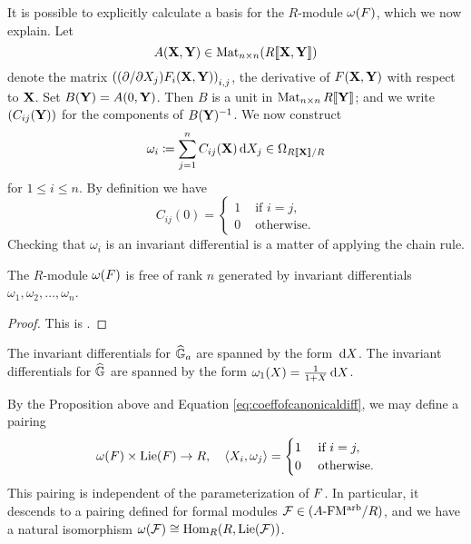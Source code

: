 \documentclass[../main.tex]{subfiles}
\begin{document}
It is possible to explicitly calculate a basis for the $R$-module
$\omega({F})$, which we now explain. Let 
$$A(\mathbf{X}, \mathbf{Y}) \in \operatorname{Mat}_{n \times n} (R\llbracket \mathbf{X}, \mathbf{Y} \rrbracket)$$ 
denote the matrix $\left((\partial/\partial X_j)F_i (\mathbf{X},\mathbf{Y})\right)_{i,j}$,
the derivative of ${F}(\mathbf{X},\mathbf{Y})$ with respect to $\mathbf{X}$. Set 
$B(\mathbf{Y}) = A(0,\mathbf{Y})$. Then $B$ is a unit in $\operatorname{Mat}_{n \times n} R\llbracket \mathbf{Y} \rrbracket$; 
and we write $(C_{ij}(\mathbf{Y}))$ for the components of 
$B(\mathbf{Y})^{-1}$. We now construct 
$$\omega_{i} \coloneqq \sum_{j=1}^n C_{ij}(\mathbf{X}) \, \mathrm{d} X_j \in \Omega_{R\llbracket \mathbf{X} \rrbracket/R}$$ 
for $1 \leq i \leq n$. By definition we have 
\begin{equation}\label{eq:coeffofcanonicaldiff}
  C_{ij}(0) = \begin{cases}
    1 &\text{ if }i = j,\\
    0 &\text{ otherwise.}
  \end{cases}
\end{equation}
Checking that $\omega_{i}$ is an invariant differential is a matter of 
applying the chain rule. 
\begin{prop}
    The $R$-module $\omega({F})$ is free of rank $n$ generated by invariant differentials
    $\omega_{1}, \omega_{2}, \dots, \omega_{n}$.
\begin{proof}
  This is \cite[Proposition 1.1]{1970HondaFormalGroups}. 
\end{proof}
\end{prop}
\begin{xpl}
  The invariant differentials for $\widehat{\mathbb{G}}_a$ are spanned by the form $\, \mathrm{d} X$. 
  The invariant differentials for $\widehat{\mathbb{G}}$ are spanned by the form 
  $\omega_1(X) = \frac 1{1+X} \, \mathrm{d} X$.
\end{xpl}
By the Proposition above and Equation \eqref{eq:coeffofcanonicaldiff}, we may
define a pairing
\begin{equation*}
  \omega({F}) \times \operatorname{Lie}({F}) \to R, \quad \langle X_i, \omega_j \rangle =
  \begin{cases}
    1 &\text{ if } i = j,\\
    0 &\text{ otherwise.}
  \end{cases}
\end{equation*}
This pairing is independent of the parameterization of ${F}$. In particular, it
descends to a pairing defined for formal modules $\mathcal{F} \in {({A}\text-\allowbreak\mathrm{FM^{arb}}/{R})}$, and
we have a natural isomorphism $\omega(\mathcal{F}) \cong \operatorname{Hom}_R(R, \operatorname{Lie}(\mathcal{F}))$.
\end{document}
